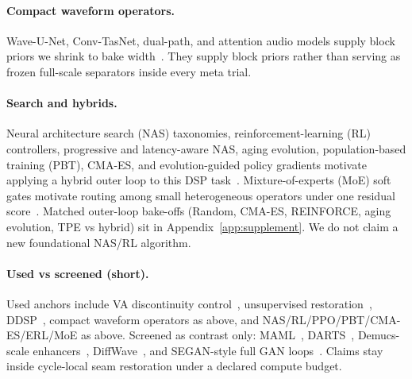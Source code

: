 \paragraph{Compact waveform operators.}
Wave-U-Net, Conv-TasNet, dual-path, and attention audio models supply block priors we shrink to bake width~\cite{stoller2018,luo2019,luo2020dprnn,subakan2021,ronneberger2015,he2016resnet,vaswani2017}.
They supply block priors rather than serving as frozen full-scale separators inside every meta trial.

\paragraph{Search and hybrids.}
Neural architecture search (NAS) taxonomies, reinforcement-learning (RL) controllers, progressive and latency-aware NAS, aging evolution, population-based training (PBT), CMA-ES, and evolution-guided policy gradients motivate applying a hybrid outer loop to this DSP task~\cite{elsken2019,zoph2017nas,pham2018,liu2018pnas,tan2019mnasnet,real2019,jaderberg2017,hansen2016cmaes,khadka2018,schulman2017}.
Mixture-of-experts (MoE) soft gates motivate routing among small heterogeneous operators under one residual score~\cite{shazeer2017}.
Matched outer-loop bake-offs (Random, CMA-ES, REINFORCE, aging evolution, TPE vs hybrid) sit in Appendix~\ref{app:supplement}.
We do not claim a new foundational NAS/RL algorithm.

\paragraph{Used vs screened (short).}
Used anchors include VA discontinuity control~\cite{stilson1996,esqueda2016blamp,nam2009polyblep}, unsupervised restoration~\cite{lehtinen2018,kashyap2021n2n,wisdom2020}, DDSP~\cite{engel2020}, compact waveform operators as above, and NAS/RL/PPO/PBT/CMA-ES/ERL/MoE as above.
Screened as contrast only: MAML~\cite{finn2017}, DARTS~\cite{liu2019}, Demucs-scale enhancers~\cite{dfossez2019,dfossez2021}, DiffWave~\cite{kong2021}, and SEGAN-style full GAN loops~\cite{pascual2017}.
Claims stay inside cycle-local seam restoration under a declared compute budget.

